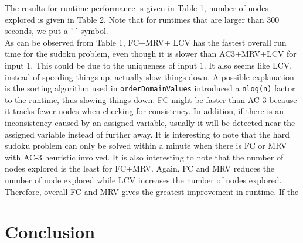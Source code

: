 \documentclass[9.5pt]{extarticle}
\begin{document}
 The results for runtime performance is given in Table 1, number of nodes explored is given in Table 2. Note that for runtimes that are larger than 300 seconds, we put a '-' symbol.\\

As can be observed from Table 1, FC+MRV+ LCV has the fastest overall run time for the sudoku problem, even though it is slower than AC3+MRV+LCV for input 1. This could be due to the uniqueness of input 1. It also seems like LCV, instead of speeding things up, actually slow things down. A possible explanation is the sorting algorithm used in \verb`orderDomainValues` introduced a \verb`nlog(n)` factor to the runtime, thus slowing things down. FC might be faster than AC-3 because it tracks fewer nodes when checking for consistency. In addition, if there is an inconsistency caused by an assigned variable, usually it will be detected near the assigned variable instead of further away. It is interesting to note that the hard sudoku problem can only be solved within a minute when there is FC or MRV with AC-3 heuristic involved. It is also interesting to note that the number of nodes explored is the least for FC+MRV. Again, FC and MRV reduces the number of node explored while LCV increases the number of nodes explored. Therefore, overall FC and MRV gives the greatest improvement in runtime. If the\\

\begin{table}[H]
\centering
\caption{Experiments performed to measure runtime with various heuristic on Sunfire}
\label{my-label}
\end{table}

\section{Conclusion}
\end{document}
